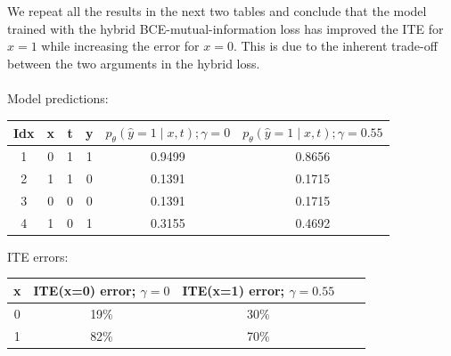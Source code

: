 \documentclass[oneside,12pt]{article}
\begin{document}
%
We repeat all the results in the next two tables and conclude that the model trained with the hybrid BCE-mutual-information loss has improved the ITE for $x=1$ while increasing the error for $x=0$. This is due to the inherent trade-off between the two arguments in the hybrid loss.\\\\ 
Model predictions:
    \begin{center}
     \begin{tabular}{||c | c | c | c | c | c ||}
     \hline
     Idx & x & t & y & $p_\theta(\hat{y}=1 \mid x,t); \gamma=0$ & $p_\theta(\hat{y}=1 \mid x,t); \gamma=0.55$ \\ [0.5ex] 
     \hline\hline
     1 & 0 & 1 & 1 & 0.9499 & 0.8656 \\ 
     \hline
     2 & 1 & 1 & 0 & 0.1391 & 0.1715 \\
     \hline
     3 & 0 & 0 & 0 & 0.1391 & 0.1715 \\
     \hline
     4 & 1 & 0 & 1 & 0.3155 & 0.4692 \\ [1ex] 
     \hline
    \end{tabular}
    \end{center}
ITE errors:
    \begin{center}
     \begin{tabular}{||c | c | c | c | c ||}
     \hline
     x & ITE(x=0) error; $\gamma=0$ & ITE(x=1) error; $\gamma=0.55$ \\ [0.5ex] 
     \hline\hline
     0 & 19\% & 30\% \\ 
     \hline
     1 & 82\% & 70\% \\ [1ex] 
     \hline
    \end{tabular}
    \end{center}
%
%
\end{document}
